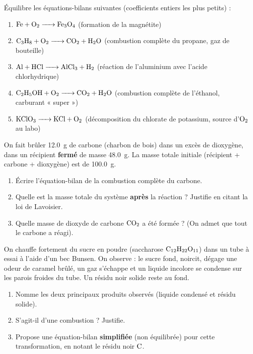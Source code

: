 \documentclass[11pt]{article}
\newcounter{popsec}
\newcounter{popsub}
\newcommand{\courssub}[1]{%
  \stepcounter{popsub}%
  \par\vspace{9pt}\noindent{\popxbold\fontsize{11.5}{13}\selectfont\color{popink}{\color{poporange}\thepopsec.\thepopsub}\hspace{6pt}#1}\par\nopagebreak\vspace{4pt}
}
\begin{document}
\courssub{Je m'entraîne}

\begin{exercice}
Équilibre les équations-bilans suivantes (coefficients entiers les plus petits) :
\begin{enumerate}
    \item $\ce{Fe + O2 -> Fe3O4}$ \quad (formation de la magnétite)
    \item $\ce{C3H8 + O2 -> CO2 + H2O}$ \quad (combustion complète du propane, gaz de bouteille)
    \item $\ce{Al + HCl -> AlCl3 + H2}$ \quad (réaction de l'aluminium avec l'acide chlorhydrique)
    \item $\ce{C2H5OH + O2 -> CO2 + H2O}$ \quad (combustion complète de l'éthanol, carburant « super »)
    \item $\ce{KClO3 -> KCl + O2}$ \quad (décomposition du chlorate de potassium, source d'$\ce{O2}$ au labo)
\end{enumerate}
\end{exercice}

\begin{exercice}
On fait brûler \SI{12,0}{g} de carbone (charbon de bois) dans un excès de dioxygène, dans un récipient \textbf{fermé} de masse \SI{48,0}{g}. La masse totale initiale (récipient + carbone + dioxygène) est de \SI{100,0}{g}.
\begin{enumerate}
    \item Écrire l'équation-bilan de la combustion complète du carbone.
    \item Quelle est la masse totale du système \textbf{après} la réaction ? Justifie en citant la loi de Lavoisier.
    \item Quelle masse de dioxyde de carbone $\ce{CO2}$ a été formée ? (On admet que tout le carbone a réagi).
\end{enumerate}
\end{exercice}

\begin{exercice}
On chauffe fortement du sucre en poudre (saccharose $\ce{C12H22O11}$) dans un tube à essai à l'aide d'un bec Bunsen. On observe : le sucre fond, noircit, dégage une odeur de caramel brûlé, un gaz s'échappe et un liquide incolore se condense sur les parois froides du tube. Un résidu noir solide reste au fond.
\begin{enumerate}
    \item Nomme les deux principaux produits observés (liquide condensé et résidu solide).
    \item S'agit-il d'une combustion ? Justifie.
    \item Propose une équation-bilan \textbf{simplifiée} (non équilibrée) pour cette transformation, en notant le résidu noir $\ce{C}$.
\end{enumerate}
\end{exercice}
\end{document}
